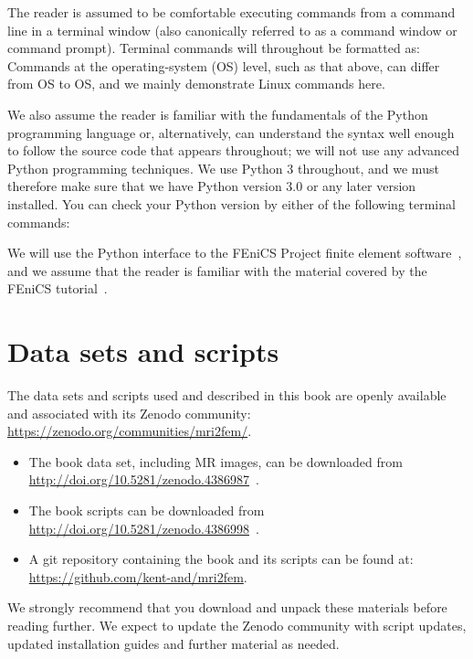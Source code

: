 The reader is assumed to be comfortable executing commands from a
command line in a terminal window (also canonically referred
to as a command window or command prompt). Terminal commands
will throughout be formatted as:
\noindent Commands at the operating-system (OS) level, such as that above,
can differ from OS to OS, and we mainly demonstrate Linux commands
here.

We also assume the reader is familiar with the fundamentals of the
Python programming language or, alternatively, can understand the
syntax well enough to follow the source code that appears throughout;
we will not use any advanced Python programming techniques. We use
Python 3 throughout, and we must therefore make sure that we have Python
version 3.0 or any later version installed. You can check
your Python version by either of the following terminal commands:

We will use the Python interface to the FEniCS Project finite
element software~\cite{alnaes2015fenics}, and we assume that the
reader is familiar with the material covered by the FEniCS
tutorial~\cite{langtangen2016solving}.

\section{Data sets and scripts}


The data sets and scripts used and described in this book are openly
available and associated with its Zenodo community:
\url{https://zenodo.org/communities/mri2fem/}. 
\begin{itemize}
\item
  The book data set, including MR images, can be downloaded from \\
  \url{http://doi.org/10.5281/zenodo.4386987}~\cite{kent_andre_mardal_2020_4386987}.
\item
  The book scripts can be downloaded from \\
  \url{http://doi.org/10.5281/zenodo.4386998}~\cite{kent_andre_mardal_2020_4386999}.
\item 
  A git repository containing the book and its scripts can be found 
  at: \\ \url{https://github.com/kent-and/mri2fem}.
\end{itemize}
We strongly recommend that you download and unpack these materials
before reading further. We expect to update the Zenodo community with
script updates, updated installation guides and further material as
needed.
 
